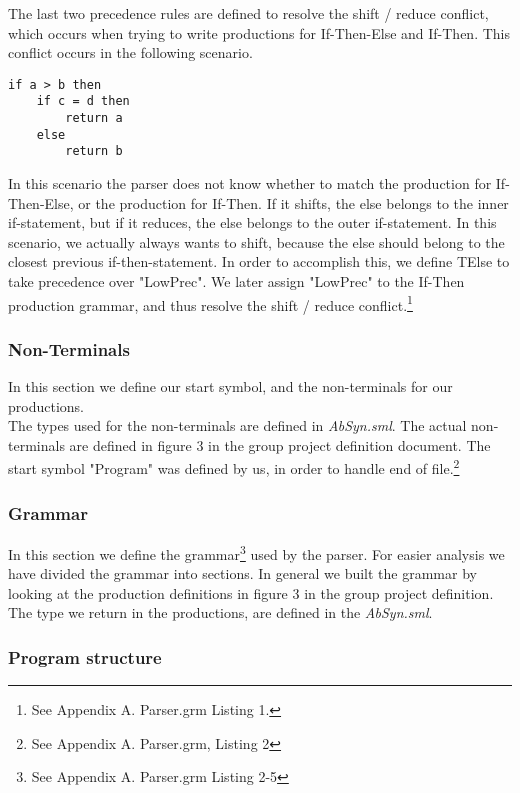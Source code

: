 \documentclass[12pt,a4paper,english]{article}
\begin{document}
The last two precedence rules are defined to resolve the shift / reduce conflict, which occurs when trying to write productions for If-Then-Else and If-Then. This conflict occurs in the following scenario. 
\begin{lstlisting}
if a > b then
    if c = d then
        return a
    else
        return b
\end{lstlisting}
In this scenario the parser does not know whether to match the production for If-Then-Else, or the production for If-Then. If it shifts, the else belongs to the inner if-statement, but if it reduces, the else belongs to the outer if-statement. In this scenario, we actually always wants to shift, because the else should belong to the closest previous if-then-statement. In order to accomplish this, we define TElse to take precedence over "LowPrec". We later assign "LowPrec" to the If-Then production grammar, and thus resolve the shift / reduce conflict.\footnote{See Appendix A. Parser.grm Listing 1.}

\subsubsection{Non-Terminals}

In this section we define our start symbol, and the non-terminals for our productions. \\
The types used for the non-terminals are defined in \textit{AbSyn.sml}. The actual non-terminals are defined in figure 3 in the group project definition document. The start symbol "Program" was defined by us, in order to handle end of file.\footnote{See Appendix A. Parser.grm, Listing 2}

\subsubsection{Grammar}

In this section we define the grammar\footnote{See Appendix A. Parser.grm Listing 2-5} used by the parser. For easier analysis we have divided the grammar into sections.
In general we built the grammar by looking at the production definitions in figure 3 in the group project definition. The type we return in the productions, are defined in the \textit{AbSyn.sml}. 

\subsubsection{Program structure}
\end{document}

